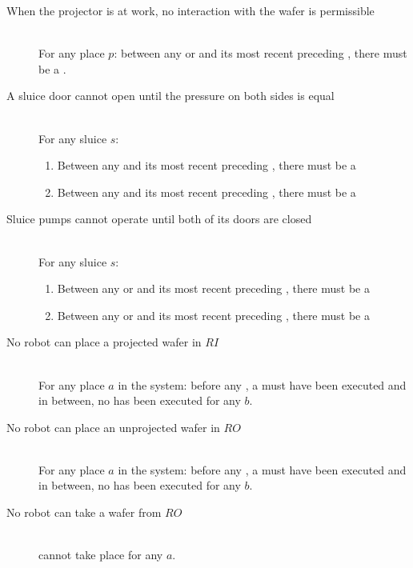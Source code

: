 \begin{description}
 \item[When the projector is at work, no interaction with the wafer is permissible] \hfill \\
 For any place $p$: between any  or  and its most recent preceding , there must be a .
 
 \item[A sluice door cannot open until the pressure on both sides is equal] \hfill \\
 For any sluice $s$:
 \begin{enumerate}
  \item Between any  and its most recent preceding , there must be a 
  \item Between any  and its most recent preceding , there must be a 
 \end{enumerate}

 \item[Sluice pumps cannot operate until both of its doors are closed] \hfill \\
 For any sluice $s$:
 \begin{enumerate}
  \item Between any  or  and its most recent preceding , there must be a 
  \item Between any  or  and its most recent preceding , there must be a 
 \end{enumerate}

\item[No robot can place a projected wafer in $RI$] \hfill \\
For any place $a$ in the system: before any , a  must have been executed and in between, no  has been executed for any $b$.

\item[No robot can place an unprojected wafer in $RO$] \hfill \\
For any place $a$ in the system: before any , a  must have been executed and in between, no  has been executed for any $b$.

\item[No robot can take a wafer from $RO$] \hfill \\
 cannot take place for any $a$.
 
\end{description}
